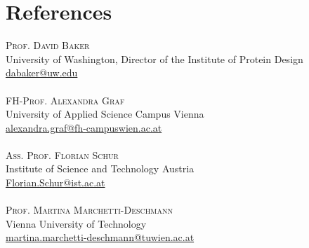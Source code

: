 \documentclass[14pt]{article} %
\begin{document}

\section*{References}

\textsc{Prof. David Baker}\\University of Washington, Director of the Institute of Protein Design\\
\href{mailto:dabaker@uw.edu}{dabaker@uw.edu}\\
\\
\textsc{FH-Prof. Alexandra Graf}\\University of Applied Science Campus Vienna\\
\href{mailto:alexandra.graf@fh-campuswien.ac.at}{alexandra.graf@fh-campuswien.ac.at}\\
\\
\textsc{Ass. Prof. Florian Schur}\\Institute of Science and Technology Austria\\
\href{mailto:Florian.Schur@ist.ac.at}{Florian.Schur@ist.ac.at}\\
\\
\textsc{Prof. Martina Marchetti-Deschmann}\\Vienna University of Technology\\
\href{mailto:martina.marchetti-deschmann@tuwien.ac.at}{martina.marchetti-deschmann@tuwien.ac.at}\\


\end{document}
